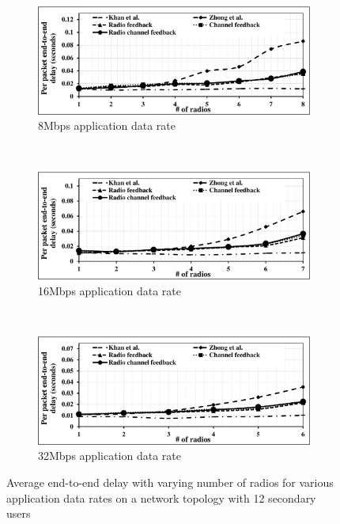 \begin{landscape}
\begin{figure}[!htbp]
\begin{subfigure}[t]{0.625\textwidth}
        \includegraphics[width=\textwidth]{alltopology/12Delay24d8}
        \caption{8Mbps application data rate}
    \end{subfigure}
    ~\\
    \begin{subfigure}[t]{0.625\textwidth}
        \includegraphics[width=\textwidth]{alltopology/12Delay24d16}
        \caption{16Mbps application data rate}
    \end{subfigure}
    ~
    \begin{subfigure}[t]{0.625\textwidth}
        \includegraphics[width=\textwidth]{alltopology/12Delay24d32}
        \caption{32Mbps application data rate}
    \end{subfigure}
    \caption{Average end-to-end delay with varying number of radios for various application data rates on a network topology with 12 secondary users}
\end{figure}
\end{landscape}

